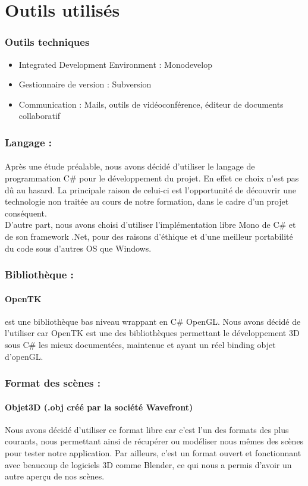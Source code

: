\documentclass{report}
\begin{document}
		\section{Outils utilisés}
			\subsubsection{Outils techniques}
				\begin{itemize}
					\item Integrated Development Environment : Monodevelop
					\item Gestionnaire de version : Subversion
					\item Communication : Mails, outils de vidéoconférence,  éditeur de documents collaboratif
				\end{itemize}
			\subsubsection{Langage :}
				\paragraph{} Après  une étude préalable, nous avons décidé d'utiliser le langage de programmation C\# pour le développement  du projet.
En effet ce choix n'est pas dû au hasard. La principale raison de celui-ci est l'opportunité de découvrir une technologie non traitée au cours de notre formation, dans le cadre d'un projet conséquent.\\ D'autre part, nous avons choisi d'utiliser l'implémentation libre Mono de C\# et de son framework .Net, pour des raisons d'éthique et d'une meilleur portabilité du code sous d'autres OS que Windows.
			\subsubsection{Bibliothèque :}
	\paragraph{OpenTK} est une bibliothèque bas niveau wrappant en C\# OpenGL. Nous avons décidé de l'utiliser car OpenTK  est une des bibliothèques permettant le développement 3D sous C\# les mieux documentées, maintenue et ayant un réel binding objet d'openGL.
			\subsubsection{Format des scènes :}
	\paragraph{Objet3D (.obj créé par la société Wavefront)} Nous avons décidé d'utiliser ce format libre car c'est l'un des formats des plus courants, nous permettant ainsi de récupérer ou modéliser nous mêmes des scènes pour tester notre application. Par ailleurs, c'est un format ouvert et fonctionnant avec beaucoup de logiciels 3D comme Blender, ce qui nous a permis d'avoir un autre aperçu de nos scènes.
		\newpage
\end{document}
